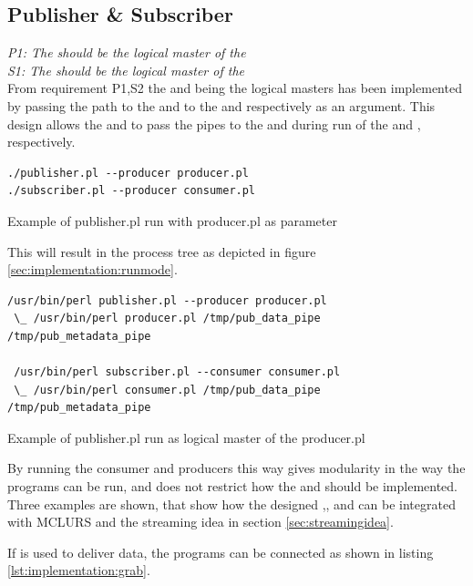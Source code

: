 \subsection{Publisher \& Subscriber}

\textit{P1: The \pub{} should be the logical master of the \pro{}}\\
\textit{S1: The \sub{} should be the logical master of the \pro{}}\\

From requirement P1,S2 the \pub{} and \sub{} being the logical masters has been implemented by passing the path to the \con{} and \pro{} to the \sub{} and \pro{} respectively as an argument. This design allows the \pub{} and \sub{} to pass the pipes to the \pro{} and \con{} during run of the \con{} and \pro{}, respectively.

\begin{listing}[H] 
\begin{verbatim}
./publisher.pl --producer producer.pl
./subscriber.pl --producer consumer.pl
\end{verbatim}
\caption{Example of publisher.pl run with producer.pl as parameter}
\label{code:critical_section_c}
\end{listing}

This will result in the process tree as depicted in figure \ref{sec:implementation:runmode}.

\begin{listing}[H] 
\begin{verbatim}
/usr/bin/perl publisher.pl --producer producer.pl
 \_ /usr/bin/perl producer.pl /tmp/pub_data_pipe /tmp/pub_metadata_pipe
 
 /usr/bin/perl subscriber.pl --consumer consumer.pl
 \_ /usr/bin/perl consumer.pl /tmp/pub_data_pipe /tmp/pub_metadata_pipe
\end{verbatim}
\caption{Example of publisher.pl run as logical master of the producer.pl}
\label{sec:implementation:runmode}
\end{listing}

By running the consumer and producers this way gives modularity in the way the programs can be run, and does not restrict how the \con{} and \pro{} should be implemented.
Three examples are shown, that show how the designed \pros{},\cons{}, \pros{} and \subs{} can be integrated with MCLURS and the streaming idea in section \ref{sec:streamingidea}.

If  is used to deliver data, the programs can be connected as shown in listing \ref{lst:implementation:grab}.

